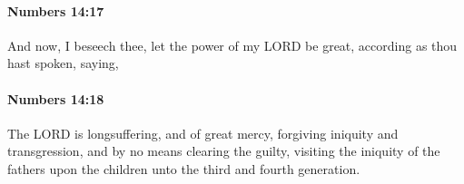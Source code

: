 		\paragraph{Numbers 14:17} %
			\label{NUMBERS-14-17}

			And now, I beseech thee, let the power of my LORD be great, according as thou hast spoken, saying,


		\paragraph{Numbers 14:18} %
			\label{NUMBERS-14-18}

			The LORD is longsuffering, and of great mercy, forgiving iniquity and transgression, and by no means clearing the guilty, visiting the iniquity of the fathers upon the children unto the third and fourth generation.


